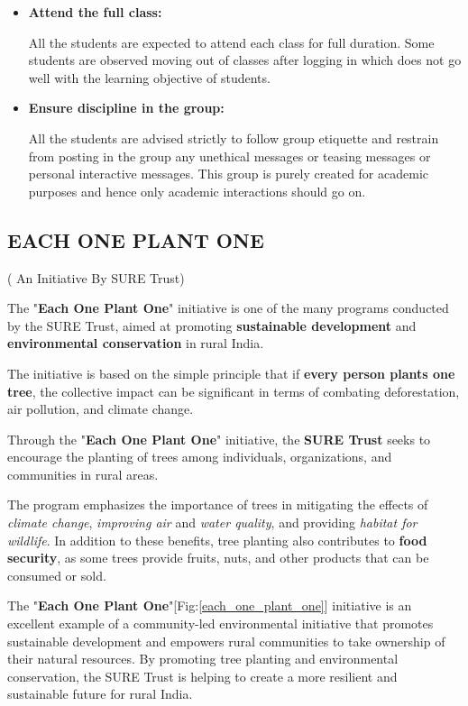 \documentclass[12pt]{article}
\begin{document}
\begin{itemize}
   \item \textbf{Attend the full class:}
   
   All the students are expected to attend each class for full duration. Some students are observed moving out of classes after logging in which does not go well with the learning objective of students.

   \item \textbf{Ensure discipline in the group:}
   
   All the students are advised strictly to follow group etiquette and restrain from posting in the group any unethical messages or teasing messages or personal interactive messages. This group is purely created for academic purposes and hence only academic interactions should go on. 

\end{itemize}
\pagebreak
 \begin{center}
   \section*{EACH ONE PLANT ONE}
  ( An Initiative By SURE Trust)
  \end{center} 
  The "\textbf{Each One Plant One}" initiative is one of the many programs conducted by the SURE Trust, aimed at promoting \textbf{sustainable development} and \textbf{environmental conservation} in rural India.
  
   The initiative is based on the simple principle that if \textbf{every person plants one tree}, the collective impact can be significant in terms of combating deforestation, air pollution, and climate change.

Through the "\textbf{Each One Plant One}" initiative, the \textbf{SURE Trust} seeks to encourage the planting of trees among individuals, organizations, and communities in rural areas.
  
The program emphasizes the importance of trees in mitigating the effects of \emph{climate change}, \emph{improving air} and \emph{water quality}, and providing \emph{habitat for wildlife}. In addition to these benefits, tree planting also contributes to \textbf{food security}, as some trees provide fruits, nuts, and other products that can be consumed or sold.

The "\textbf{Each One Plant One}"[Fig:\ref{each_one_plant_one}] initiative is an excellent example of a community-led environmental initiative that promotes sustainable development and empowers rural communities to take ownership of their natural resources. By promoting tree planting and environmental conservation, the SURE Trust is helping to create a more resilient and sustainable future for rural India.\\
\end{document}

